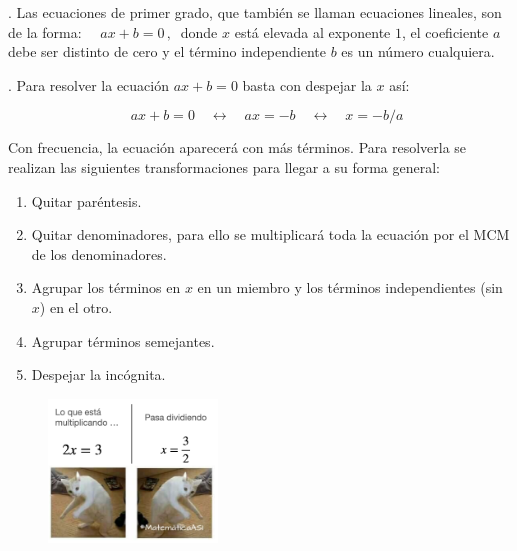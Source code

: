 \begin{definition}
. Las ecuaciones de primer grado, que también se llaman ecuaciones  lineales, son de la forma: $\quad ax + b =0 \, , \ $
donde   $x$   está elevada al exponente $1$, el coeficiente   $a$   debe ser distinto de cero y el término independiente   $b$   es un número cualquiera.
\end{definition}

\begin{theorem}
. Para resolver la ecuación   $ax + b = 0$   basta con despejar la $x$ así:

$$\quad ax + b = 0   \quad \leftrightarrow \quad    ax = - b   \quad \leftrightarrow \quad  x = -b/a$$
\end{theorem}
Con frecuencia, la ecuación aparecerá con más términos. Para resolverla se realizan las siguientes transformaciones para llegar a su forma general:
\vspace{-2mm} 
\begin{multicols}{2}
\begin{enumerate}
\vspace{-2mm} \item Quitar paréntesis.
\vspace{-2mm} \item Quitar denominadores, para ello se multiplicará toda la ecuación por el MCM de los denominadores.
\vspace{-2mm} \item Agrupar los términos en $x$ en un miembro y los términos independientes (sin $x$) en el otro.

\vspace{-2mm} \item Agrupar términos semejantes.
\vspace{-2mm} \item Despejar la incógnita.
\end{enumerate}

\begin{figure}[H]
	\centering
	\includegraphics[width=0.4\textwidth]{img-ecc/ecc01.png}
\end{figure}
\end{multicols}

